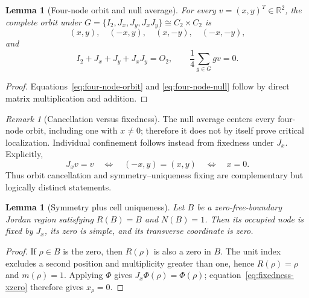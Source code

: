 \documentclass[11pt]{amsart}
\newtheorem{lemma}[theorem]{Lemma}
\theoremstyle{definition}
\theoremstyle{remark}
\newtheorem{remark}[theorem]{Remark}
\begin{document}
\begin{lemma}[Four-node orbit and null average]\label{lem:four-node-average}
For every $v=(x,y)^T\in\mathbb R^2$, the complete orbit under
$G=\{I_2,J_x,J_y,J_xJ_y\}\cong C_2\times C_2$ is
\begin{equation}\label{eq:four-node-orbit}
 (x,y),\quad(-x,y),\quad(x,-y),\quad(-x,-y),
\end{equation}
and
\begin{equation}\label{eq:four-node-null}
 I_2+J_x+J_y+J_xJ_y=O_2,
 \qquad
 \frac14\sum_{g\in G}gv=0.
\end{equation}
\end{lemma}

\begin{proof}
Equations~\eqref{eq:four-node-orbit} and \eqref{eq:four-node-null} follow by direct matrix
multiplication and addition.
\end{proof}

\begin{remark}[Cancellation versus fixedness]\label{rem:cancellation-fixedness}
The null average centers every four-node orbit, including one with $x\ne0$; therefore it does
not by itself prove critical localization.  Individual confinement follows instead from
fixedness under $J_x$.  Explicitly,
\begin{equation}\label{eq:fixedness-xzero}
 J_xv=v\quad\Longleftrightarrow\quad(-x,y)=(x,y)
 \quad\Longleftrightarrow\quad x=0.
\end{equation}
Thus orbit cancellation and symmetry--uniqueness fixing are complementary but logically
distinct statements.
\end{remark}

\begin{lemma}[Symmetry plus cell uniqueness]\label{lem:symmetry-uniqueness-cell}
Let $B$ be a zero-free-boundary Jordan region satisfying $R(B)=B$ and $N(B)=1$.
Then its occupied node is fixed by $J_x$, its zero is simple, and its transverse coordinate
is zero.
\end{lemma}

\begin{proof}
If $\rho\in B$ is the zero, then $R(\rho)$ is also a zero in $B$.  The unit index excludes a
second position and multiplicity greater than one, hence $R(\rho)=\rho$ and $m(\rho)=1$.
Applying $\Phi$ gives $J_x\Phi(\rho)=\Phi(\rho)$; equation~\eqref{eq:fixedness-xzero}
therefore gives $x_\rho=0$.
\end{proof}
\end{document}
